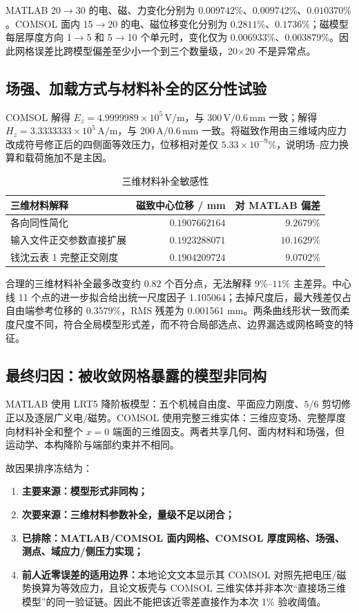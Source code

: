 \documentclass[UTF8,fontset=windows,11pt,a4paper]{ctexart}
\begin{document}
MATLAB 20$\to$30 的电、磁、力变化分别为 $0.009742\%$、$0.009742\%$、$0.010370\%$。COMSOL 面内 15$\to$20 的电、磁位移变化分别为 $0.2811\%$、$0.1736\%$；磁模型每层厚度方向 1$\to$5 和 5$\to$10 个单元时，变化仅为 $0.006933\%$、$0.003879\%$。因此网格误差比跨模型偏差至少小一个到三个数量级，20$\times$20 不是异常点。

\subsection{场强、加载方式与材料补全的区分性试验}

COMSOL 解得 $E_z=4.9999989\times10^5\,\mathrm{V/m}$，与 $300\,\mathrm{V}/0.6\,\mathrm{mm}$ 一致；解得 $H_z=3.3333333\times10^5\,\mathrm{A/m}$，与 $200\,\mathrm{A}/0.6\,\mathrm{mm}$ 一致。将磁致作用由三维域内应力改成符号修正后的四侧面等效压力，位移相对差仅 $5.33\times10^{-9}\%$，说明场--应力换算和载荷施加不是主因。

\begin{table}[H]
\centering
\caption{三维材料补全敏感性}
\small
\begin{tabular}{lrr}
\toprule
三维材料解释 & 磁致中心位移 / mm & 对 MATLAB 偏差 \\
\midrule
各向同性简化 & $0.1907662164$ & $9.2679\%$ \\
输入文件正交参数直接扩展 & $0.1923288071$ & $10.1629\%$ \\
钱沈云表 1 完整正交刚度 & $0.1904209724$ & $9.0702\%$ \\
\bottomrule
\end{tabular}
\end{table}

合理的三维材料补全最多改变约 $0.82$ 个百分点，无法解释 $9\%$--$11\%$ 主差异。中心线 11 个点的进一步拟合给出统一尺度因子 1.105064；去掉尺度后，最大残差仅占自由端参考位移的 $0.3579\%$，RMS 残差为 0.001561 mm。两条曲线形状一致而柔度尺度不同，符合全局模型形式差，而不符合局部选点、边界漏选或网格畸变的特征。

\subsection{最终归因：被收敛网格暴露的模型非同构}

MATLAB 使用 LRT5 降阶板模型：五个机械自由度、平面应力刚度、$5/6$ 剪切修正以及逐层广义电/磁势。COMSOL 使用完整三维实体：三维应变场、完整厚度向材料补全和整个 $x=0$ 端面的三维固支。两者共享几何、面内材料和场强，但运动学、本构降阶与端部约束并不相同。

故因果排序冻结为：
\begin{enumerate}[label=\arabic*.]
\item \textbf{主要来源：模型形式非同构；}
\item \textbf{次要来源：三维材料参数补全，量级不足以闭合；}
\item \textbf{已排除：MATLAB/COMSOL 面内网格、COMSOL 厚度网格、场强、测点、域应力/侧压力实现；}
\item \textbf{前人近零误差的适用边界：}本地论文文本显示其 COMSOL 对照先把电压/磁势换算为等效应力，且论文板壳与 COMSOL 三维实体并非本次“直接场三维模型”的同一验证链。因此不能把该近零差直接作为本次 1\% 验收阈值。
\end{enumerate}
\end{document}
